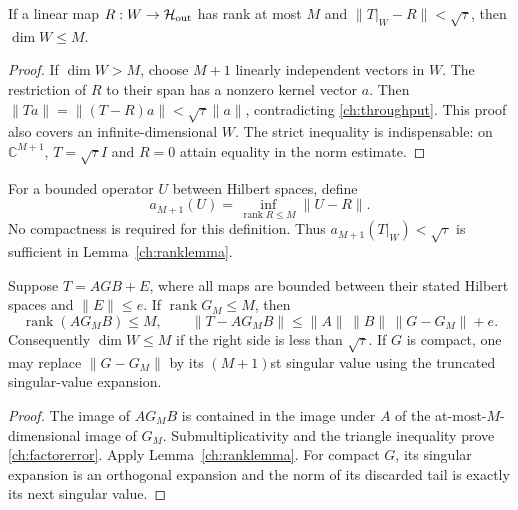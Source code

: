 \begin{lemma}
\label{ch:ranklemma}
If a linear map $R:W\to\mathcal H_{\rm out}$ has rank at most $M$ and
$\|T|_W-R\|<\sqrt\tau$, then $\dim W\leq M$.
\end{lemma}
\begin{proof}
If $\dim W>M$, choose $M+1$ linearly independent vectors in $W$.
The restriction of $R$ to their span has a nonzero kernel vector $a$.
Then $\|Ta\|=\|(T-R)a\|<\sqrt\tau\|a\|$, contradicting
\eqref{ch:throughput}.  This proof also covers an infinite-dimensional $W$.
The strict inequality is indispensable: on $\mathbb C^{M+1}$,
$T=\sqrt\tau I$ and $R=0$ attain equality in the norm estimate.
\end{proof}

\begin{definition}
\label{ch:approxdef}
For a bounded operator $U$ between Hilbert spaces, define
\begin{equation}
 a_{M+1}(U)=\inf_{\operatorname{rank}R\leq M}\|U-R\|.
 \label{ch:approxnumber}
\end{equation}
No compactness is required for this definition.  Thus
$a_{M+1}(T|_W)<\sqrt\tau$ is sufficient in Lemma~\ref{ch:ranklemma}.
\end{definition}

\begin{proposition}
\label{ch:factorization}
Suppose $T=AGB+E$, where all maps are bounded between their stated Hilbert
spaces and $\|E\|\leq e$.  If $\operatorname{rank}G_M\leq M$, then
\begin{equation}
 \operatorname{rank}(AG_MB)\leq M,\qquad
 \|T-AG_MB\|\leq \|A\|\,\|B\|\,\|G-G_M\|+e.
 \label{ch:factorerror}
\end{equation}
Consequently $\dim W\leq M$ if the right side is less than $\sqrt\tau$.
If $G$ is compact, one may replace $\|G-G_M\|$ by its $(M+1)$st singular
value using the truncated singular-value expansion.
\end{proposition}
\begin{proof}
The image of $AG_MB$ is contained in the image under $A$ of the
at-most-$M$-dimensional image of $G_M$.  Submultiplicativity and the triangle
inequality prove \eqref{ch:factorerror}.  Apply Lemma~\ref{ch:ranklemma}.
For compact $G$, its singular expansion is an orthogonal expansion and the
norm of its discarded tail is exactly its next singular value.
\end{proof}

